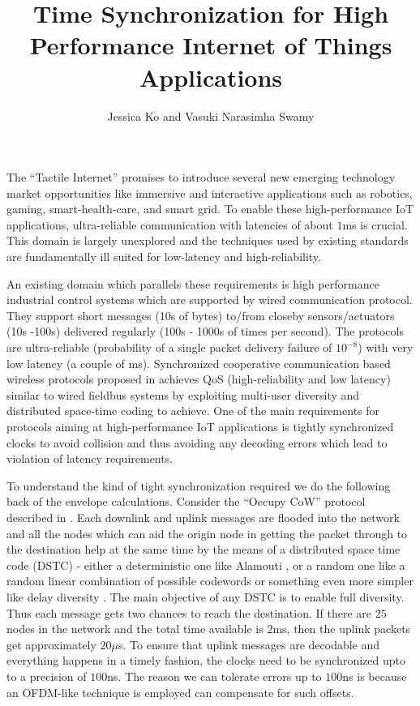 \documentclass[10pt, journal, letter, onecolumn]{IEEEtran}
\begin{document}
\title{Time Synchronization for High Performance Internet of Things Applications}

\author{
    Jessica Ko and Vasuki Narasimha Swamy
}
\maketitle
{}

The ``Tactile Internet'' promises to introduce several new emerging technology market opportunities like immersive and interactive applications such as robotics, gaming, smart-health-care, and smart grid.
To enable these high-performance IoT applications, ultra-reliable communication with latencies of about $1$ms is crucial.
This domain is largely unexplored and the techniques used by existing standards are fundamentally ill suited for low-latency and high-reliability.

An existing domain which parallels these requirements is high performance industrial control systems which are supported by wired communication protocol.
They support short messages (10s of bytes) to/from closeby sensors/actuators (10s -100s) delivered regularly (100s - 1000s of times per second). The protocols are ultra-reliable (probability of a single packet delivery failure of $10^{-8}$) with very low latency (a couple of ms).
Synchronized cooperative communication based wireless protocols proposed in \cite{swamy2015cooperative, swamy2016cooperative} achieves QoS (high-reliability and low latency) similar to wired fieldbus systems by exploiting multi-user diversity and distributed space-time coding to achieve.
One of the main requirements for protocols aiming at high-performance IoT applications is tightly synchronized clocks to avoid collision and thus avoiding any decoding errors which lead to violation of latency requirements.

To understand the kind of tight synchronization required we do the following back of the envelope calculations. Consider the ``Occupy CoW'' protocol described in \cite{swamy2015cooperative}. Each downlink and uplink messages are flooded into the network and all the nodes which can aid the origin node in getting the packet through to the destination help at the same time by the means of a distributed space time code (DSTC) - either a deterministic one like Alamouti \cite{alamouti1998simple}, or a random one like a random linear combination of possible codewords \cite{sirkeci2007randomized} or something even more simpler like delay diversity \cite{bossert2002cyclic}. The main objective of any DSTC is to enable full diversity. Thus each message gets two chances to reach the destination. If there are $25$ nodes in the network and the total time available is $2$ms, then the uplink packets get approximately $20 \mu$s. To ensure that uplink messages are decodable and everything happens in a timely fashion, the clocks need to be synchronized upto to a precision of $100$ns. The reason we can tolerate errors up to $100$ns is because an OFDM-like technique is employed can compensate for such offsets.
\end{document}
